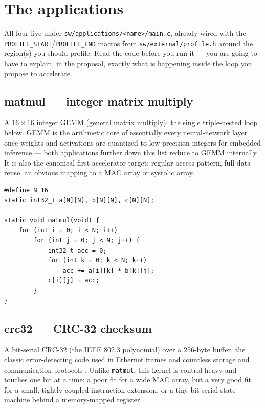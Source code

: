 \documentclass[11pt]{article}
\newcommand{\code}[1]{\texttt{#1}}
\begin{document}
\section{The applications}

All four live under \code{sw/applications/<name>/main.c}, already wired with
the \code{PROFILE\_START}/\code{PROFILE\_END} macros from
\code{sw/external/profile.h} around the region(s) you should profile. Read
the code before you run it --- you are going to have to explain, in the
proposal, exactly what is happening inside the loop you propose to
accelerate.

\subsection{matmul --- integer matrix multiply}

A $16\times16$ integer GEMM (general matrix multiply): the single triple-nested
loop below. GEMM is the arithmetic core of essentially every neural-network
layer once weights and activations are quantized to low-precision integers
for embedded inference \cite{jacob2018quantization} --- both applications
further down this list reduce to GEMM internally. It is also the canonical
first accelerator target: regular access pattern, full data reuse, an
obvious mapping to a MAC array or systolic array.

\begin{lstlisting}[style=clisting]
#define N 16
static int32_t a[N][N], b[N][N], c[N][N];

static void matmul(void) {
    for (int i = 0; i < N; i++)
        for (int j = 0; j < N; j++) {
            int32_t acc = 0;
            for (int k = 0; k < N; k++)
                acc += a[i][k] * b[k][j];
            c[i][j] = acc;
        }
}
\end{lstlisting}

\subsection{crc32 --- CRC-32 checksum}

A bit-serial CRC-32 (the IEEE 802.3 polynomial) over a 256-byte buffer, the
classic error-detecting code used in Ethernet frames and countless storage
and communication protocols \cite{peterson1961cyclic}. Unlike \code{matmul},
this kernel is control-heavy and touches one bit at a time: a poor fit for a
wide MAC array, but a very good fit for a small, tightly-coupled instruction
extension, or a tiny bit-serial state machine behind a memory-mapped
register.
\end{document}
